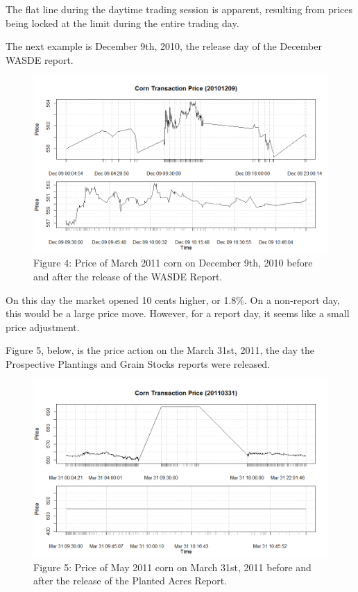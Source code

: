 \documentclass[]{book}
\theoremstyle{definition}
\theoremstyle{definition}
\theoremstyle{remark}
\begin{document}
The flat line during the daytime trading session is apparent, resulting
from prices being locked at the limit during the entire trading day.

The next example is December 9th, 2010, the release day of the December
WASDE report.

\begin{figure}[htbp]
\centering
\includegraphics{images/101209.png}
\caption{Figure 4: Price of March 2011 corn on December 9th, 2010 before
and after the release of the WASDE Report.}
\end{figure}

On this day the market opened 10 cents higher, or 1.8\%. On a non-report
day, this would be a large price move. However, for a report day, it
seems like a small price adjustment.

Figure 5, below, is the price action on the March 31st, 2011, the day
the Prospective Plantings and Grain Stocks reports were released.

\begin{figure}[htbp]
\centering
\includegraphics{images/110331.png}
\caption{Figure 5: Price of May 2011 corn on March 31st, 2011 before and
after the release of the Planted Acres Report.}
\end{figure}
\end{document}
